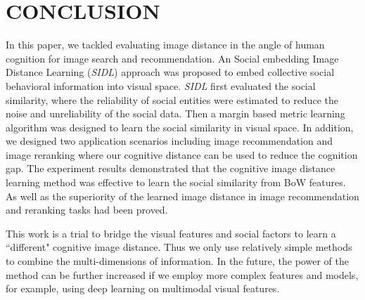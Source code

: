 \vspace{-0.2cm}\section{CONCLUSION}
In this paper, we tackled evaluating image distance in the angle of human cognition for image search and recommendation. An Social embedding Image Distance Learning (\emph{SIDL}) approach was proposed to embed collective social behavioral information into visual space. \emph{SIDL} first evaluated the social similarity, where the reliability of social entities were estimated to reduce the noise and unreliability of the social data. Then a margin based metric learning algorithm was designed to learn the social similarity in visual space. In addition, we designed two application scenarios including image recommendation and image reranking where our cognitive distance can be used to reduce the cognition gap. The experiment results demonstrated that the cognitive image distance learning method was effective to learn the social similarity from BoW features. As well as the superiority of the learned image distance in image recommendation and reranking tasks had been proved.

This work is a trial to bridge the visual features and social factors to learn a ``different" cognitive image distance. Thus we only use relatively simple methods to combine the multi-dimensions of information. In the future, the power of the method can be further increased if we employ more complex features and models, for example, using deep learning on multimodal visual features.
